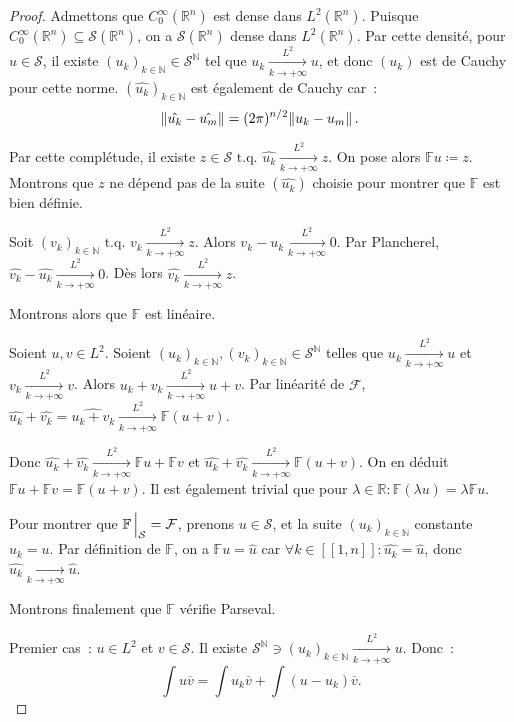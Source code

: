 \documentclass{report}
\newcommand{\R}{{\mathbb R}}
\newcommand{\N}{{\mathbb N}}
\newcommand{\tq}{\text{ t.q. }}
\newcommand{\pinfty}{{+\infty}}
\newcommand{\intint}[2]{{[[#1, #2]]}}
\theoremstyle{definition}
\theoremstyle{remark}
\begin{document}
\begin{proof} Admettons que $C_0^\infty(\R^n)$ est dense dans $L^2(\R^n)$. Puisque $C_0^\infty(\R^n) \subseteq \mathcal S(\R^n)$, on a $\mathcal S(\R^n)$ dense dans $L^2(\R^n)$.
Par cette densité, pour $u \in \mathcal S$, il existe $(u_k)_{k \in \N} \in \mathcal S^\N$ tel que $u_k \xrightarrow[k \to \pinfty]{L^2} u$, et donc $(u_k)$ est de Cauchy
pour cette norme. $(\hat {u_k})_{k \in \N}$ est également de Cauchy car~:
\[\norm {\hat {u_k} - \hat {u_m}} = (2\pi)^{n/2}\norm {u_k - u_m}.\]

Par cette complétude, il existe $z \in \mathcal S \tq \hat {u_k} \xrightarrow[k \to \pinfty]{L^2} z$. On pose alors $\mathbb Fu \coloneqq z$. Montrons que $z$ ne dépend pas
de la suite $(\hat {u_k})$ choisie pour montrer que $\mathbb F$ est bien définie.

Soit $(v_k)_{k \in \N} \tq v_k \xrightarrow[k \to \pinfty]{L^2} z$. Alors $v_k-u_k \xrightarrow[k \to \pinfty]{L^2} 0$. Par Plancherel,
$\hat {v_k}-\hat {u_k} \xrightarrow[k \to \pinfty]{L^2} 0$. Dès lors $\hat {v_k} \xrightarrow[k \to \pinfty]{L^2} z$.

Montrons alors que $\mathbb F$ est linéaire.

Soient $u, v \in L^2$. Soient $(u_k)_{k \in \N}, (v_k)_{k \in \N} \in \mathcal S^\N$ telles que $u_k \xrightarrow[k \to \pinfty]{L^2} u$ et $v_k \xrightarrow[k \to \pinfty]{L^2} v$.
Alors $u_k+v_k \xrightarrow[k \to \pinfty]{L^2} u+v$. Par linéarité de $\mathcal F$, $\hat {u_k} + \hat {v_k} = \widehat {u_k + v_k} \xrightarrow[k \to \pinfty]{L^2} \mathbb F(u+v)$.

Donc $\hat {u_k} + \hat {v_k} \xrightarrow[k \to \pinfty]{L^2} \mathbb Fu + \mathbb Fv$ et $\hat {u_k} + \hat {v_k} \xrightarrow[k \to \pinfty]{L^2} \mathbb F(u+v)$.
On en déduit $\mathbb F u + \mathbb F v = \mathbb F(u+v)$. Il est également trivial que pour $\lambda \in \R : \mathbb F(\lambda u) = \lambda \mathbb Fu$.

Pour montrer que $\mathbb F\sVert[2]_{\mathcal S} = \mathcal F$, prenons $u \in \mathcal S$, et la suite $(u_k)_{k \in \N}$ constante $u_k = u$. Par définition de $\mathbb F$,
on a $\mathbb Fu = \hat u$ car $\forall k \in \intint 1n : \hat {u_k} = \hat u$, donc $\hat {u_k} \xrightarrow[k \to \pinfty]{} \hat u$.

Montrons finalement que $\mathbb F$  vérifie Parseval.

Premier cas~: $u \in L^2$ et $v \in \mathcal S$. Il existe $\mathcal S^\N \ni (u_k)_{k \in \N} \xrightarrow[k \to \pinfty]{L^2} u$. Donc~:
\[\int u\overline v = \int u_k\overline v + \int (u-u_k)\overline v.\]


\end{proof}
\end{document}
